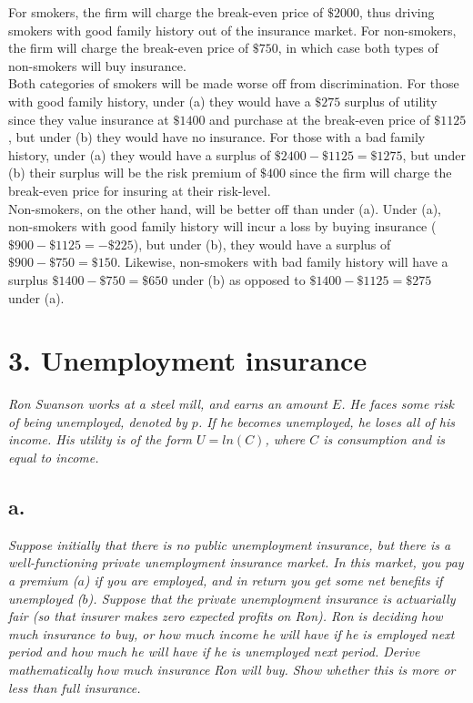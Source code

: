 \documentclass[
]{article}
\begin{document}
For smokers, the firm will charge the break-even price of \(\$2000\),
thus driving smokers with good family history out of the insurance
market. For non-smokers, the firm will charge the break-even price of
\(\$750\), in which case both types of non-smokers will buy insurance.\\
Both categories of smokers will be made worse off from discrimination.
For those with good family history, under (a) they would have a
\(\$275\) surplus of utility since they value insurance at \(\$1400\)
and purchase at the break-even price of \(\$1125\), but under (b) they
would have no insurance. For those with a bad family history, under (a)
they would have a surplus of \(\$2400 - \$1125 = \$1275\), but under (b)
their surplus will be the risk premium of \(\$400\) since the firm will
charge the break-even price for insuring at their risk-level.\\
Non-smokers, on the other hand, will be better off than under (a). Under
(a), non-smokers with good family history will incur a loss by buying
insurance (\(\$900 - \$1125 = -\$225\)), but under (b), they would have
a surplus of \(\$900 - \$750 = \$ 150\). Likewise, non-smokers with bad
family history will have a surplus \(\$1400 - \$750 = \$650\) under (b)
as opposed to \(\$1400 - \$1125=\$275\) under (a).

\hypertarget{unemployment-insurance}{%
\section{3. Unemployment insurance}\label{unemployment-insurance}}

\textit{Ron Swanson works at a steel mill, and earns an amount $E$. He faces some risk of being unemployed, denoted by $p$. If he becomes unemployed, he loses all of his income. His utility is of the form $U = ln(C)$, where $C$ is consumption and is equal to income.}

\hypertarget{a.-2}{%
\subsection{a.}\label{a.-2}}

\textit{Suppose initially that there is no public unemployment insurance, but there is a well-functioning private unemployment insurance market. In this market, you pay a premium ($a$) if you are employed, and in return you get some net benefits if unemployed ($b$). Suppose that the private unemployment insurance is actuarially fair (so that insurer makes zero expected profits on Ron). Ron is deciding how much insurance to buy, or how much income he will have if he is employed next period and how much he will have if he is unemployed next period. Derive mathematically how much insurance Ron will buy. Show whether this is more or less than full insurance.}
\end{document}
